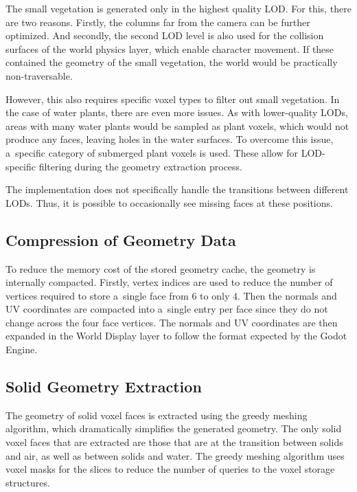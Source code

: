 The small vegetation is generated only in the highest quality LOD. For this, there are two reasons. Firstly, the columns far from the camera can be further optimized. And secondly, the second LOD level is also used for the collision surfaces of the world physics layer, which enable character movement. If these contained the geometry of the small vegetation, the world would be practically non-traversable.

However, this also requires specific voxel types to filter out small vegetation. In the case of water plants, there are even more issues. As with lower-quality LODs, areas with many water plants would be sampled as plant voxels, which would not produce any faces, leaving holes in the water surfaces. To overcome this issue, a~specific category of submerged plant voxels is used. These allow for LOD-specific filtering during the geometry extraction process.

The implementation does not specifically handle the transitions between different LODs. Thus, it is possible to occasionally see missing faces at these positions.

\subsection{Compression of Geometry Data}

To reduce the memory cost of the stored geometry cache, the geometry is internally compacted. Firstly, vertex indices are used to reduce the number of vertices required to store a~single face from $6$ to only $4$. Then the normals and UV coordinates are compacted into a~single entry per face since they do not change across the four face vertices. The normals and UV coordinates are then expanded in the World Display layer to follow the format expected by the Godot Engine.

\subsection{Solid Geometry Extraction}

The geometry of solid voxel faces is extracted using the greedy meshing algorithm, which dramatically simplifies the generated geometry. The only solid voxel faces that are extracted are those that are at the transition between solids and air, as well as between solids and water. The greedy meshing algorithm uses voxel masks for the slices to reduce the number of queries to the voxel storage structures.

